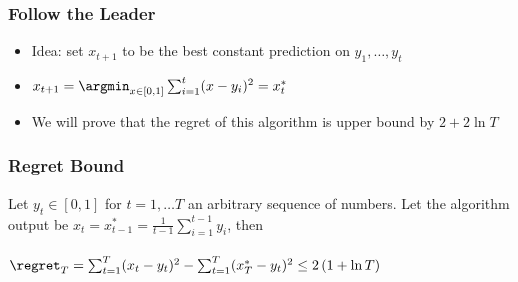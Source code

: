 \documentclass{beamer}
\begin{document}
\begin{frame}
\frametitle{Follow the Leader}
\begin{itemize}
\item Idea: set $x_{t+1}$ to be the best constant prediction on $y_1,\ldots,y_t$
\item 
  $x_{t+1} = \argmin_{x \in [0,1]} \sum_{i=1}^t (x-y_i)^2 = x^*_t$ 
\item We will prove that the regret of this algorithm is upper bound
  by $2+2 \ln T$
\end{itemize}
\end{frame}
\iffalse
\begin{frame}
\frametitle{A more general setup}
\begin{itemize}
\item General euclidean space: $\vx,\vy$ are elements in $V \subset \RR^d$
\item The loss function for time step $t$ maps $\vx$ to $\RR$:\\
  $\ell_t: V \to \RR$
\item For square loss: $\elloss{\vx}{t} = (\vx -\vy_t)^2$
\item Regret relative to $\vu \in V$:
$\regret_T = \sum_{t=1}^T \elloss{\vx_t}{t} - \sum_{t=1}^T
  \elloss{\vu}{t} $
\end{itemize}
\end{frame}

\begin{frame}
\frametitle{Technical Lemma}
\begin{lemma}
  Let $\vx_t^*$ be the minimizer of $\sum_{i=1}^t \elloss{\vx}{i}$. Then
$  \sum_{t=1}^T \elloss{\vx_t^*}{t} \leq \sum_{t=1}^T \elloss{\vx_T^*}{t}$
  \end{lemma}
\end{frame}
\fi
\begin{frame}
\frametitle{Regret Bound}
\begin{theorem}
Let $y_t \in [0,1]$ for $t=1,\ldots T$ an arbitrary sequence of
numbers. Let the algorithm output be
$ x_t = x_{t-1}^* = \frac{1}{t-1} \sum_{i=1}^{t-1} y_i$, then\\
~\\
$ \regret_T = \sum_{t=1}^T (x_t-y_t)^2 - \sum_{t=1}^T (x^*_T-y_t)^2
\leq 2 \, (1 + \ln T) $
\end{theorem}
\end{frame}
\end{document}
